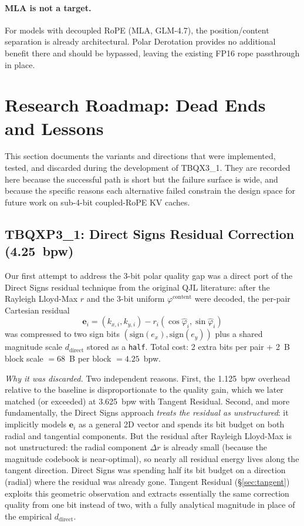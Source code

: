 \documentclass[10pt,twocolumn]{article}
\begin{document}
\paragraph{MLA is not a target.}
For models with decoupled RoPE (MLA, GLM-4.7), the position/content separation is already architectural. Polar Derotation provides no additional benefit there and should be bypassed, leaving the existing FP16 rope passthrough in place.

\section{Research Roadmap: Dead Ends and Lessons}
\label{sec:deadends}

This section documents the variants and directions that were implemented, tested, and discarded during the development of TBQX3\_1. They are recorded here because the successful path is short but the failure surface is wide, and because the specific reasons each alternative failed constrain the design space for future work on sub-4-bit coupled-RoPE KV caches.

\subsection{TBQXP3\_1: Direct Signs Residual Correction (4.25~bpw)}

Our first attempt to address the 3-bit polar quality gap was a direct port of the Direct Signs residual technique from the original QJL literature: after the Rayleigh Lloyd-Max $r$ and the 3-bit uniform $\varphi^{\text{content}}$ were decoded, the per-pair Cartesian residual
\begin{equation*}
\mathbf{e}_i = (k_{x,i}, k_{y,i}) - r_i(\cos\hat\varphi_i,\sin\hat\varphi_i)
\end{equation*}
was compressed to two sign bits $(\text{sign}(e_x),\text{sign}(e_y))$ plus a shared magnitude scale $d_{\text{direct}}$ stored as a \texttt{half}. Total cost: 2 extra bits per pair + 2~B block scale $= 68$~B per block $= 4.25$~bpw.

\emph{Why it was discarded.} Two independent reasons. First, the 1.125~bpw overhead relative to the baseline is disproportionate to the quality gain, which we later matched (or exceeded) at 3.625~bpw with Tangent Residual. Second, and more fundamentally, the Direct Signs approach \emph{treats the residual as unstructured}: it implicitly models $\mathbf{e}_i$ as a general 2D vector and spends its bit budget on both radial and tangential components. But the residual after Rayleigh Lloyd-Max is not unstructured: the radial component $\Delta r$ is already small (because the magnitude codebook is near-optimal), so nearly all residual energy lives along the tangent direction. Direct Signs was spending half its bit budget on a direction (radial) where the residual was already gone. Tangent Residual (\S\ref{sec:tangent}) exploits this geometric observation and extracts essentially the same correction quality from one bit instead of two, with a fully analytical magnitude in place of the empirical $d_{\text{direct}}$.
\end{document}
